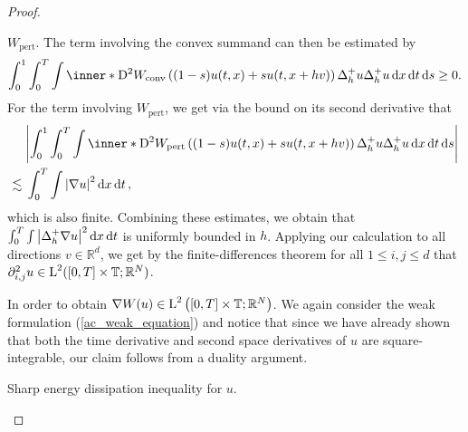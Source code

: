 \begin{proof}
\begin{description}[wide=0pt]
		$ W_{ \mathrm{pert} } $. The term involving the convex summand can then 
		be estimated by
		\begin{equation*}
			\int_{ 0 }^{ 1 }
			\int_{ 0 }^{ T }
			\int
			\inner*{ 
				\diff^{ 2 } W_{ \mathrm{conv} } \left( ( 1- s ) u ( t, x  ) + s u( t,  x + h v ) \right) 
				\Delta_{ h }^{ + } u
			}{
				\Delta_{ h }^{ + } u 
			}
			\dd{ x }
			\dd{ t }
			\dd{ s }
			\geq 0. 
		\end{equation*}
		For the term involving $ W_{ \mathrm{pert} } $, we get via the bound on 
		its second derivative that
		\begin{align*}
			& \abs{
				\int_{ 0 }^{ 1 }
				\int_{ 0 }^{ T }
				\int
				\inner*{ 
					\diff^{ 2 } W_{ \mathrm{pert} } \left( (1 - s ) u ( t, x  ) + s  u( t,  x + h v )  \right) 
					\Delta_{ h }^{ + } u
				}{
					\Delta_{ h }^{ + } u 
				}
				\dd{ x }
				\dd{ t }
				\dd{ s }
			}
			\\
			\lesssim {} &
			\int_{ 0 }^{ T }
			\int
			\abs{ \nabla u }^{ 2 }
			\dd{ x }
			\dd{ t },
		\end{align*}
		which is also finite. 
		Combining these estimates, we obtain that $ \int_{ 0 }^{ T } \int \abs{ \Delta_{ h }^{ + } \nabla u }^{ 2 } \dd{ x } \dd{ t } $ is uniformly bounded in $ h $. Applying our calculation to all directions $ v \in \mathbb{ R }^{ d } $, we get by the finite-differences theorem for all $ 1 \leq i, j \leq d $ that $ \partial_{ i , j }^{ 2 } u \in \operatorname{L}^{ 2 } ( [ 0 , T ] \times \operatorname{\mathbb{T}} ; \mathbb{ R }^{ N } ) $.
		
		In order to obtain $ \nabla W ( u ) \in \operatorname{L}^{ 2 } \left( [ 0 , T ] 
		\times 
		\operatorname{\mathbb{T}} ; \mathbb{ R }^{ N } \right) $. We again consider the weak 
		formulation (\ref{ac_weak_equation}) and notice that since we have 
		already shown that both the time derivative and second space 
		derivatives of $ u $ are square-integrable, our claim follows from a 
		duality argument.
		
		\item[Step 9:] Sharp energy dissipation inequality for $ u $.
		

\end{description}
\end{proof}
